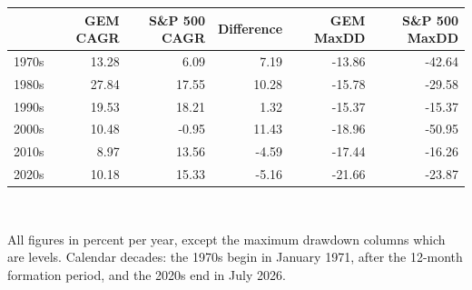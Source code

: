 \small
\begin{tabular}{lrrrrr}
\toprule
  & \textbf{GEM CAGR} & \textbf{S\&P 500 CAGR} & \textbf{Difference} & \textbf{GEM MaxDD} & \textbf{S\&P 500 MaxDD} \\
\midrule
1970s & 13.28 & 6.09 & 7.19 & -13.86 & -42.64 \\
1980s & 27.84 & 17.55 & 10.28 & -15.78 & -29.58 \\
1990s & 19.53 & 18.21 & 1.32 & -15.37 & -15.37 \\
2000s & 10.48 & -0.95 & 11.43 & -18.96 & -50.95 \\
2010s & 8.97 & 13.56 & -4.59 & -17.44 & -16.26 \\
2020s & 10.18 & 15.33 & -5.16 & -21.66 & -23.87 \\
\bottomrule
\end{tabular}
\\[0.4em]
\begin{minipage}{\linewidth}\footnotesize All figures in percent per year, except the maximum drawdown columns which are levels. Calendar decades: the 1970s begin in January 1971, after the 12-month formation period, and the 2020s end in July 2026.\end{minipage}
